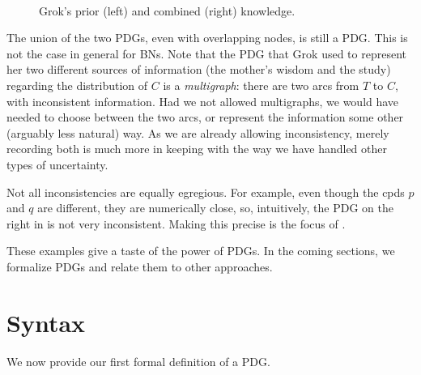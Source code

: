 \begin{example}
\begin{figure}
	\fi
	\hfill~
	\caption{Grok's prior (left) and combined (right) knowledge.}
	\label{fig:grok-combine}
\end{figure}

The union of the two PDGs, even with overlapping 
nodes, is still a PDG.
This is not the case in general
for BNs.
Note that the PDG that Grok used to
represent her two different sources of information (the mother's wisdom and the
study) regarding the distribution of $C$ is a \emph{multigraph}: there are two
arcs from $T$ to $C$, with inconsistent information.
Had we not allowed multigraphs, we would have needed to choose between the two arcs, or represent the
information some other (arguably less natural) way. As we are already allowing
inconsistency, merely recording both is much more in keeping with the way we
have handled other types of uncertainty. 
\end{example}

Not all inconsistencies are equally egregious. For example, even though the cpds
$p$ and $q$ are different, they are numerically close, so, intuitively, the PDG on the right in
 is not very inconsistent.
Making this precise 
is
the focus of .

These examples give a taste of the power of PDGs.  
In the coming sections, we formalize PDGs and relate them to other approaches.
	
	
\section{Syntax}\label{sec:formal+syntax}
We now provide our first formal definition of a PDG.


